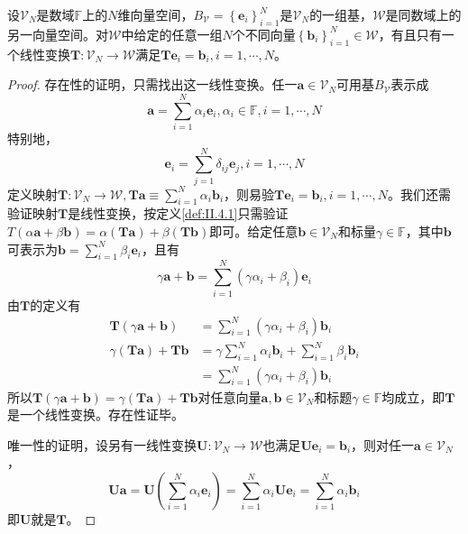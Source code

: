 \documentclass[main.tex]{subfiles}
\begin{document}
\begin{lemma}\label{lem:II.4.1}
设$\mathcal{V}_N$是数域$\mathbb{F}$上的$N$维向量空间，$B_\mathcal{V}=\left\{\mathbf{e}_i\right\}_{i=1}^N$是$\mathcal{V}_N$的一组基，$\mathcal{W}$是同数域上的另一向量空间。对$\mathcal{W}$中给定的任意一组$N$个不同向量$\left\{\mathbf{b}_i\right\}_{i=1}^N\in\mathcal{W}$，有且只有一个线性变换$\mathbf{T}:\mathcal{V}_N\rightarrow\mathcal{W}$满足$\mathbf{Te}_i=\mathbf{b}_i,i=1,\cdots,N$。
\end{lemma}
\begin{proof}
存在性的证明，只需找出这一线性变换。任一$\mathbf{a}\in\mathcal{V}_N$可用基$B_\mathcal{V}$表示成
\[\mathbf{a}=\sum_{i=1}^N\alpha_i\mathbf{e}_i,\alpha_i\in\mathbb{F},i=1,\cdots,N\]
特别地，
\[\mathbf{e}_i=\sum_{j=1}^N\delta_{ij}\mathbf{e}_j,i=1,\cdots,N\]
定义映射$\mathbf{T}:\mathcal{V}_N\rightarrow\mathcal{W},\mathbf{Ta}\equiv\sum_{i=1}^N\alpha_i\mathbf{b}_i$，则易验$\mathbf{Te}_i=\mathbf{b}_i,i=1,\cdots,N$。我们还需验证映射$\mathbf{T}$是线性变换，按定义\ref{def:II.4.1}只需验证$T\left(\alpha\mathbf{a}+\beta\mathbf{b}\right)=\alpha\left(\mathbf{Ta}\right)+\beta\left(\mathbf{Tb}\right)$即可。给定任意$\mathbf{b}\in\mathcal{V}_N$和标量$\gamma\in\mathbb{F}$，其中$\mathbf{b}$可表示为$\mathbf{b}=\sum_{i=1}^N\beta_i\mathbf{e}_i$，且有
\[\gamma\mathbf{a}+\mathbf{b}=\sum_{i=1}^N\left(\gamma\alpha_i+\beta_i\right)\mathbf{e}_i\]
由$\mathbf{T}$的定义有
\begin{align}
\mathbf{T}\left(\gamma\mathbf{a}+\mathbf{b}\right)&=\sum_{i=1}^N\left(\gamma\alpha_i+\beta_i\right)\mathbf{b}_i\\
\gamma\left(\mathbf{Ta}\right)+\mathbf{Tb}&=\gamma\sum_{i=1}^N\alpha_i\mathbf{b}_i+\sum_{i=1}^N\beta_i\mathbf{b}_i\\
&=\sum_{i=1}^N\left(\gamma\alpha_i+\beta_i\right)\mathbf{b}_i
\end{align}
所以$\mathbf{T}\left(\gamma\mathbf{a}+\mathbf{b}\right)=\gamma\left(\mathbf{Ta}\right)+\mathbf{Tb}$对任意向量$\mathbf{a},\mathbf{b}\in\mathcal{V}_N$和标题$\gamma\in\mathbb{F}$均成立，即$\mathbf{T}$是一个线性变换。存在性证毕。

唯一性的证明，设另有一线性变换$\mathbf{U}:\mathcal{V}_N\rightarrow\mathcal{W}$也满足$\mathbf{Ue}_i=\mathbf{b}_i$，则对任一$\mathbf{a}\in\mathcal{V}_N$，
\[
\mathbf{Ua}=\mathbf{U}\left(\sum_{i=1}^N\alpha_i\mathbf{e}_i\right)=\sum_{i=1}^N\alpha_i\mathbf{Ue}_i=\sum_{i=1}^N\alpha_i\mathbf{b}_i\]
即$\mathbf{U}$就是$\mathbf{T}$。
\end{proof}
\end{document}
